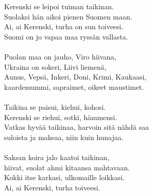 
            Kerenski se leipoi tuiman taikinan. \\
            Suolaksi hän aikoi pienen Suomen maan. \\
            Ai, ai Kerenski, turha on sun toiveesi. \\
            Suomi on jo vapaa maa ryssän vallasta. \\
\hspace{10mm} \\
            Puolan maa on jauho, Viro hiivana, \\
            Ukraina on sokeri, Liivi liemenä, \\
            Aunus, Vepsä, Inkeri, Doni, Krimi, Kaukaasi, \\
            kaardemummi, sapraimet, oikeet maustimet. \\
\hspace{10mm} \\
            Taikina se paisui, kiehui, kohosi. \\
            Kerenski se riehui, sotki, hämmensi. \\
            Vatkas hyvää taikinaa, harvoin sitä nähdä saa \\
            suloista ja makeaa, niin kuin hunajaa. \\
\hspace{10mm} \\
            Saksan koira jalo kaatoi taikinan, \\
            hiivat, suolat ahmi kitaansa mahtavaan. \\
            Kokki itse karkasi, ulkomaille loikkasi. \\
            Ai, ai Kerenski, turha toiveesi. \\
